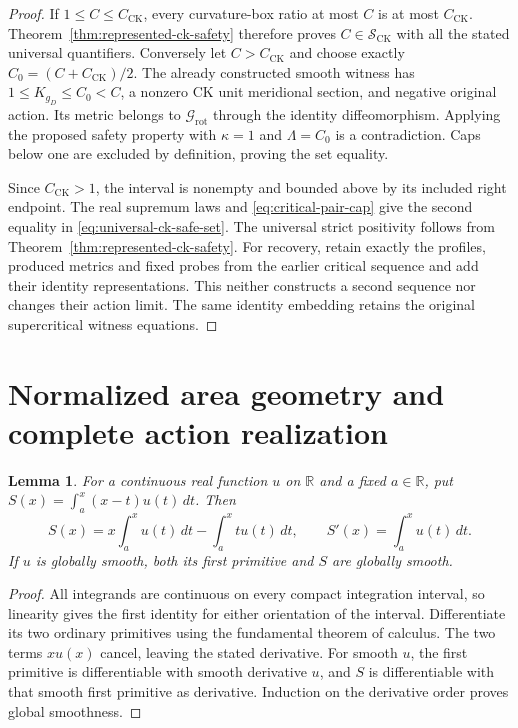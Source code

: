 \documentclass[11pt]{article}
\newtheorem{lemma}[theorem]{Lemma}
\newcommand{\R}{\mathbb R}
\begin{document}
\begin{proof}
If $1\leq C\leq C_{\mathrm{CK}}$, every curvature-box ratio at most $C$
is at most $C_{\mathrm{CK}}$. Theorem~\ref{thm:represented-ck-safety}
therefore proves $C\in\mathcal S_{\mathrm{CK}}$ with all the stated
universal quantifiers.
Conversely let $C>C_{\mathrm{CK}}$ and choose exactly
$C_0=(C+C_{\mathrm{CK}})/2$. The already constructed smooth witness has
$1\leq K_{g_D}\leq C_0<C$, a nonzero CK unit meridional section, and negative
original action. Its metric belongs to $\mathcal G_{\mathrm{rot}}$ through
the identity diffeomorphism. Applying the proposed safety property with
$\kappa=1$ and $\Lambda=C_0$ is a contradiction.
Caps below one are excluded by definition, proving the set equality.

Since $C_{\mathrm{CK}}>1$, the interval is nonempty and bounded above by its
included right endpoint. The real supremum laws and
\eqref{eq:critical-pair-cap} give the second equality in
\eqref{eq:universal-ck-safe-set}.
The universal strict positivity follows from
Theorem~\ref{thm:represented-ck-safety}. For recovery, retain exactly the
profiles, produced metrics and fixed probes from the earlier critical
sequence and add their identity representations. This neither constructs
a second sequence nor changes their action limit. The same identity
embedding retains the original supercritical witness equations.
\end{proof}

\section{Normalized area geometry and complete action realization}

\begin{lemma}\label{lem:area-second-primitive}
For a continuous real function $u$ on $\R$ and a fixed $a\in\R$, put
$S(x)=\int_a^x(x-t)u(t)\,dt$. Then
\[
 S(x)=x\int_a^x u(t)\,dt-\int_a^x t u(t)\,dt,\qquad
 S'(x)=\int_a^x u(t)\,dt .
\]
If $u$ is globally smooth, both its first primitive and $S$ are globally smooth.
\end{lemma}

\begin{proof}
All integrands are continuous on every compact integration interval, so
linearity gives the first identity for either orientation of the interval.
Differentiate its two ordinary primitives using the fundamental theorem of
calculus. The two terms $xu(x)$ cancel, leaving the stated derivative.
For smooth $u$, the first primitive is differentiable with smooth derivative
$u$, and $S$ is differentiable with that smooth first primitive as derivative.
Induction on the derivative order proves global smoothness.
\end{proof}
\end{document}

